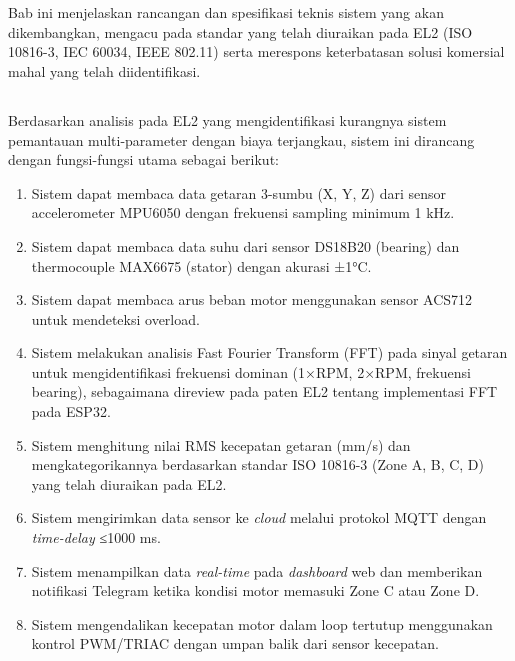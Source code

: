 \documentclass{elsinta}
\begin{document}
\section{\SystemSpecTitle}

Bab ini menjelaskan rancangan dan spesifikasi teknis sistem yang akan dikembangkan, mengacu pada standar yang telah diuraikan pada EL2 (ISO 10816-3, IEC 60034, IEEE 802.11) serta merespons keterbatasan solusi komersial mahal yang telah diidentifikasi.

\subsection{\FunctionalSpecTitle}

Berdasarkan analisis pada EL2 yang mengidentifikasi kurangnya sistem pemantauan multi-parameter dengan biaya terjangkau, sistem ini dirancang dengan fungsi-fungsi utama sebagai berikut:

\begin{enumerate}
    \item Sistem dapat membaca data getaran 3-sumbu (X, Y, Z) dari sensor accelerometer MPU6050 dengan frekuensi sampling minimum 1 kHz.
    \item Sistem dapat membaca data suhu dari sensor DS18B20 (bearing) dan thermocouple MAX6675 (stator) dengan akurasi ±1°C.
    \item Sistem dapat membaca arus beban motor menggunakan sensor ACS712 untuk mendeteksi overload.
    \item Sistem melakukan analisis Fast Fourier Transform (FFT) pada sinyal getaran untuk mengidentifikasi frekuensi dominan (1×RPM, 2×RPM, frekuensi bearing), sebagaimana direview pada paten EL2 tentang implementasi FFT pada ESP32.
    \item Sistem menghitung nilai RMS kecepatan getaran (mm/s) dan mengkategorikannya berdasarkan standar ISO 10816-3 (Zone A, B, C, D) yang telah diuraikan pada EL2.
    \item Sistem mengirimkan data sensor ke \textit{cloud} melalui protokol MQTT dengan \textit{time-delay} ≤1000 ms.
    \item Sistem menampilkan data \textit{real-time} pada \textit{dashboard} web dan memberikan notifikasi Telegram ketika kondisi motor memasuki Zone C atau Zone D.
    \item Sistem mengendalikan kecepatan motor dalam loop tertutup menggunakan kontrol PWM/TRIAC dengan umpan balik dari sensor kecepatan.
\end{enumerate}
\end{document}
